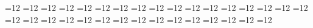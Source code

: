 =12 %
{}=12 %
{}=12 %
{}=12 %
{}=12 %
{}=12 %
{}=12 %
{}=12 %
{}=12 %
{}=12 %
{}=12 %
{}=12 %
{}=12 %
{}=12 %
{}=12 %
{}=12 %
{}=12 %
{}=12 %
{}=12 %
{}=12 %
{}=12 %
{}=12 %
{}=12 %
{}=12 %
{}=12 %
{}=12 %
{}=12 %
{}=12 %
{}=12 %
{}=12 %
{}=12 %
{}=12 %
